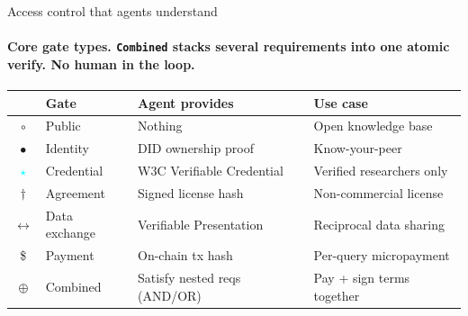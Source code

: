 \documentclass[aspectratio=169,10pt]{beamer}
\begin{document}
\begin{frame}[shrink=3]{Access control that agents understand}
\framesubtitle{Core gate types. \texttt{Combined} stacks several requirements into one atomic verify. No human in the loop.}

\vspace{0.1cm}

\begin{center}
\renewcommand{\arraystretch}{1.25}
{\footnotesize
\begin{tabular}{c l l l}
\toprule
& \textcolor{txtw}{\textbf{Gate}} & \textcolor{slate}{\textbf{Agent provides}} & \textcolor{slate}{\textbf{Use case}} \\
\midrule
\textcolor{mint}{$\circ$} & Public & Nothing & Open knowledge base \\
\textcolor{accent}{$\bullet$} & Identity & DID ownership proof & Know-your-peer \\
\textcolor{cyan}{$\star$} & Credential & W3C Verifiable Credential & Verified researchers only \\
\textcolor{amber}{$\dagger$} & Agreement & Signed license hash & Non-commercial license \\
\textcolor{accent}{$\leftrightarrow$} & Data exchange & Verifiable Presentation & Reciprocal data sharing \\
\textcolor{rose}{\$} & Payment & On-chain tx hash & Per-query micropayment \\
\textcolor{accent}{$\oplus$} & Combined & Satisfy nested reqs (AND/OR) & Pay + sign terms together \\
\bottomrule
\end{tabular}
}
\end{center}

\vspace{0.2cm}


\end{frame}
\end{document}
